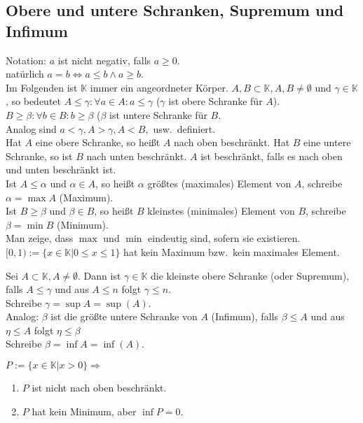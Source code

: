 \documentclass[../ana1.tex]{subfiles}
\begin{document}
\subsection{Obere und untere Schranken, Supremum und Infimum}
\begin{prosa}
	Notation: \(a\) ist nicht negativ, falls \(a\geq 0\).\\
	natürlich \(a=b\Leftrightarrow a\leq b \wedge a \geq b\).\\
	Im Folgenden ist \(\mathbb{K}\) immer ein angeordneter Körper. \(A,B \subset \mathbb{K}, A,B\neq \emptyset \) und \( \gamma \in \mathbb{K}\), so bedeutet \(A\leq \gamma: \forall a\in A: a \leq \gamma \) (\( \gamma \) ist obere Schranke für \(A\)).\\
	\(B\geq \beta: \forall b\in B: b\geq \beta \) (\( \beta \) ist untere Schranke für \(B\).\\
	Analog sind \(a<\gamma, A>\gamma, A<B, \) usw.\ definiert.\\
	Hat \(A\) eine obere Schranke, so heißt \(A\) nach oben beschränkt. Hat \(B\) eine untere Schranke, so ist \(B\) nach unten beschränkt. \(A\) ist beschränkt, falls es nach oben und unten beschränkt ist.\\
	Ist \(A\leq \alpha \) und \( \alpha\in A\), so heißt \( \alpha \) größtes (maximales) Element von \(A\), schreibe \( \alpha = \max A\) (Maximum).\\
	Ist \(B\geq \beta \) und \( \beta\in B\), so heißt \(B\) kleinstes (minimales) Element von \(B\), schreibe \( \beta = \min B\) (Minimum).\\
	Man zeige, dass \( \max \) und \( \min \) eindeutig sind, sofern sie existieren.\\
	\( [0,1) := \{x\in\mathbb{K}|0\leq x\leq 1\} \) hat kein Maximum bzw.\ kein maximales Element.
\end{prosa}
\begin{defi}
	Sei \(A\subset \mathbb{K}, A\neq \emptyset \). Dann ist \( \gamma\in\mathbb{K}\) die kleinste obere Schranke (oder Supremum), falls \(A\leq \gamma \) und aus \(A\leq n\) folgt \( \gamma \leq n\).\\
	Schreibe \( \gamma = \sup A = \sup(A)\).\\
	Analog: \( \beta \) ist die größte untere Schranke von \(A\) (Infimum), falls \( \beta \leq A\) und aus \( \eta \leq A\) folgt \( \eta \leq \beta \) \\
	Schreibe \( \beta = \inf A = \inf(A)\).
\end{defi}
\begin{bsp}
	\(P := \{x\in\mathbb{K}|x>0\} \Rightarrow \)
	\begin{enumerate}
		\item \(P\) ist nicht nach oben beschränkt.
		\item \(P\) hat kein Minimum, aber \( \inf P = 0\).
	\end{enumerate}
\end{bsp}
\end{document}

